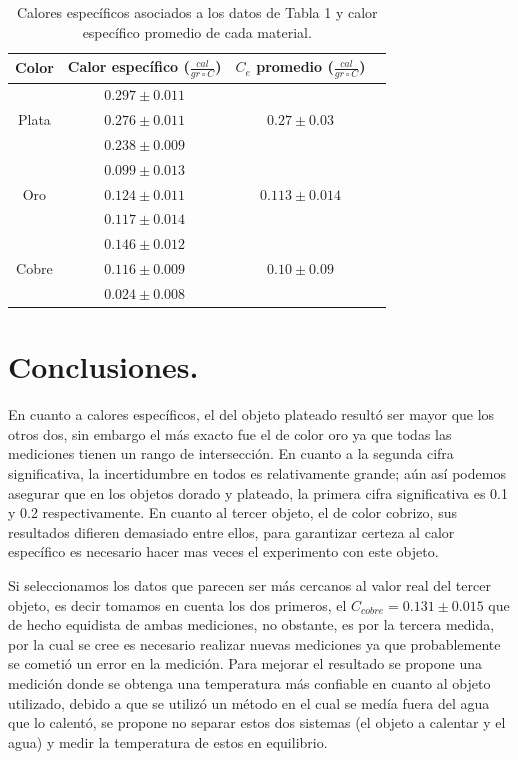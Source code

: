 \documentclass[a4paper]{article}
\begin{document}
\begin{table}[H]
    \centering
    \begin{tabular}{ |c|c|c|c| } 
\hline
Color & Calor específico ($\frac{cal}{gr{\circ}C}$) & $C_e$ promedio ($\frac{cal}{gr{\circ}C}$) \\
\hline

\multirow{3}{4em}{Plata} & $0.297 \pm 0.011$ &  \\ 
& $0.276 \pm 0.011$ & $0.27 \pm 0.03$ \\ 
& $0.238 \pm 0.009$ &  \\ 
\hline

\multirow{3}{4em}{Oro} & $0.099 \pm 0.013$ &  \\ 
& $0.124 \pm 0.011$ & $0.113 \pm 0.014$ \\ 
& $0.117 \pm 0.014$ &  \\ 
\hline

\multirow{3}{4em}{Cobre} & $0.146 \pm 0.012$ &  \\ 
& $0.116 \pm 0.009$ & $0.10 \pm 0.09$ \\ 
& $0.024 \pm 0.008$ &  \\ 
\hline

\end{tabular}
    \caption{Calores específicos asociados a los datos de Tabla 1 y calor específico promedio de cada material.}
    \label{Tabla 2}
\end{table}





\section*{Conclusiones.}

En cuanto a calores específicos, el del objeto plateado resultó ser mayor que los otros dos, sin embargo el más exacto fue el de color oro ya que todas las mediciones tienen un rango de intersección. En cuanto a la segunda cifra significativa, la incertidumbre en todos es relativamente grande; aún así podemos asegurar que en los objetos dorado y plateado, la primera cifra significativa es 0.1 y 0.2 respectivamente. En cuanto al tercer objeto, el de color cobrizo, sus resultados difieren demasiado entre ellos, para garantizar certeza al calor específico es necesario hacer mas veces el experimento con este objeto.

Si seleccionamos los datos que parecen ser más cercanos al valor real del tercer objeto, es decir tomamos en cuenta los dos primeros, el $C_{cobre} = 0.131 \pm 0.015$ que de hecho equidista de ambas mediciones, no obstante, es por la tercera medida, por la cual se cree es necesario realizar nuevas mediciones ya que probablemente se cometió un error en la medición. Para mejorar el resultado se propone una medición donde se obtenga una temperatura más confiable en cuanto al objeto utilizado, debido a que se utilizó un método en el cual se medía fuera del agua que lo calentó, se propone no separar estos dos sistemas (el objeto a calentar y el agua) y medir la temperatura de estos en equilibrio.
\end{document}
